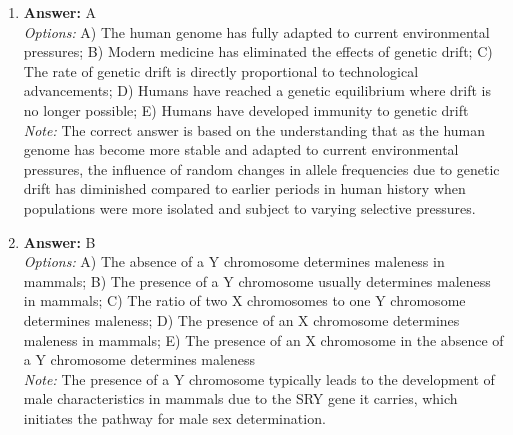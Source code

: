\documentclass[12pt]{article}
\begin{document}
\begin{enumerate}[label=\arabic*.]
\item \textbf{Answer:} A
\\ \textit{Options:} A) The human genome has fully adapted to current environmental pressures; B) Modern medicine has eliminated the effects of genetic drift; C) The rate of genetic drift is directly proportional to technological advancements; D) Humans have reached a genetic equilibrium where drift is no longer possible; E) Humans have developed immunity to genetic drift
\\ \textit{Note:} The correct answer is based on the understanding that as the human genome has become more stable and adapted to current environmental pressures, the influence of random changes in allele frequencies due to genetic drift has diminished compared to earlier periods in human history when populations were more isolated and subject to varying selective pressures.
\item \textbf{Answer:} B
\\ \textit{Options:} A) The absence of a Y chromosome determines maleness in mammals; B) The presence of a Y chromosome usually determines maleness in mammals; C) The ratio of two X chromosomes to one Y chromosome determines maleness; D) The presence of an X chromosome determines maleness in mammals; E) The presence of an X chromosome in the absence of a Y chromosome determines maleness
\\ \textit{Note:} The presence of a Y chromosome typically leads to the development of male characteristics in mammals due to the SRY gene it carries, which initiates the pathway for male sex determination.
\end{enumerate}
\end{document}
